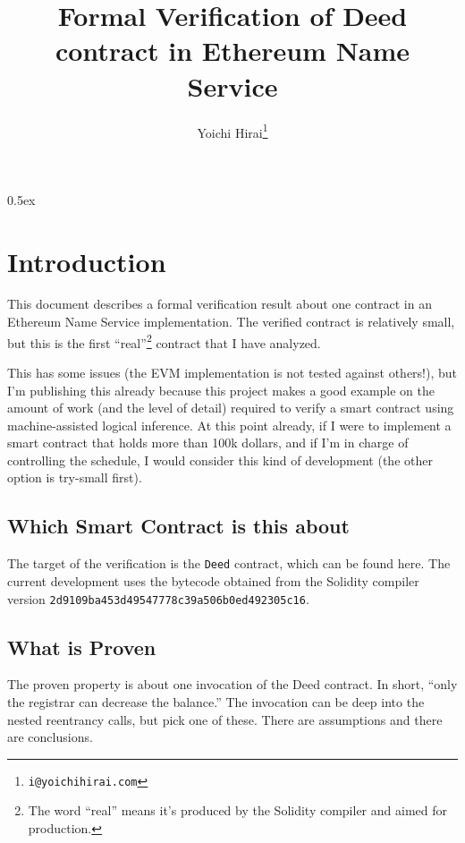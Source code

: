 \documentclass[11pt,a4paper]{article}
\begin{document}
\title{Formal Verification of Deed contract in Ethereum Name Service}
\author{Yoichi Hirai\footnote{\texttt{i@yoichihirai.com}}}
\maketitle

\tableofcontents

\parindent 0pt\parskip 0.5ex

\section{Introduction}

This document describes a formal verification result about one contract in
an Ethereum Name Service implementation.  The verified contract is relatively small,
but this is the first ``real''\footnote{The word ``real'' means it's
produced by the Solidity compiler and aimed for production.}
contract that I have analyzed.

This has some issues (the EVM implementation is not tested against
others!), but I'm publishing this already because this project makes a
good example on the amount of work (and the level of detail) required to
verify a smart contract using machine-assisted logical inference.  At this
point already, if I were to
implement a smart contract that holds more than 100k dollars, and if
I'm in charge of controlling the schedule, I would consider this kind of
development (the other option is try-small first).

\subsection{Which Smart Contract is this about}

The target of the verification is the \texttt{Deed} contract,
which can be found here. %
The current development uses the bytecode obtained from the
Solidity compiler version
\texttt{2d9109ba453d49547778c39a506b0ed492305c16}. %

\subsection{What is Proven}

The proven property is about one invocation of the Deed contract.
In short, ``only the registrar can decrease the balance.''
The invocation can be deep into the nested reentrancy calls, but pick
one of these.
There are assumptions and there are conclusions.
\end{document}
